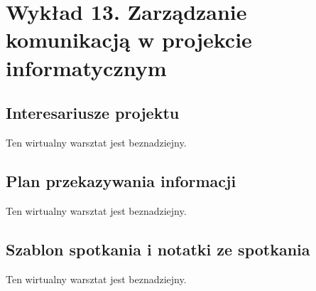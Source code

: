 \chapter{Wykład 13. Zarządzanie komunikacją w projekcie informatycznym}

\section{Interesariusze projektu}

Ten wirtualny warsztat jest beznadziejny.


\section{Plan przekazywania informacji}

Ten wirtualny warsztat jest beznadziejny.


\section{Szablon spotkania i notatki ze spotkania}

Ten wirtualny warsztat jest beznadziejny.


